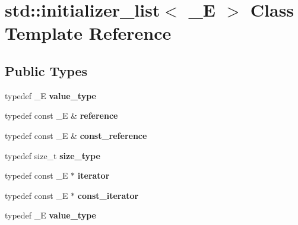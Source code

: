 \hypertarget{classstd_1_1initializer__list}{\section{std\+:\+:initializer\+\_\+list$<$ \+\_\+\+E $>$ Class Template Reference}
\label{classstd_1_1initializer__list}
}
\subsection*{Public Types}
\begin{DoxyCompactItemize}
\item 
\hypertarget{classstd_1_1initializer__list_a7fdd14ee462cb21964aaf27292b22e44}{typedef \+\_\+\+E {\bfseries value\+\_\+type}}\label{classstd_1_1initializer__list_a7fdd14ee462cb21964aaf27292b22e44}

\item 
\hypertarget{classstd_1_1initializer__list_a9ae3449dee1b4746cea9f0e49acad2d9}{typedef const \+\_\+\+E \& {\bfseries reference}}\label{classstd_1_1initializer__list_a9ae3449dee1b4746cea9f0e49acad2d9}

\item 
\hypertarget{classstd_1_1initializer__list_a523491e84d4ddab44fa4032075b0a5b6}{typedef const \+\_\+\+E \& {\bfseries const\+\_\+reference}}\label{classstd_1_1initializer__list_a523491e84d4ddab44fa4032075b0a5b6}

\item 
\hypertarget{classstd_1_1initializer__list_a4197888190261ccb4b52a4e4ae40707e}{typedef size\+\_\+t {\bfseries size\+\_\+type}}\label{classstd_1_1initializer__list_a4197888190261ccb4b52a4e4ae40707e}

\item 
\hypertarget{classstd_1_1initializer__list_a9ea4453a3ae7128135984dd4b83a501f}{typedef const \+\_\+\+E $\ast$ {\bfseries iterator}}\label{classstd_1_1initializer__list_a9ea4453a3ae7128135984dd4b83a501f}

\item 
\hypertarget{classstd_1_1initializer__list_a593e06204d2f7245b8031f9f4a0b0ada}{typedef const \+\_\+\+E $\ast$ {\bfseries const\+\_\+iterator}}\label{classstd_1_1initializer__list_a593e06204d2f7245b8031f9f4a0b0ada}

\item 
\hypertarget{classstd_1_1initializer__list_a7fdd14ee462cb21964aaf27292b22e44}{typedef \+\_\+\+E {\bfseries value\+\_\+type}}\label{classstd_1_1initializer__list_a7fdd14ee462cb21964aaf27292b22e44}


\end{DoxyCompactItemize}
